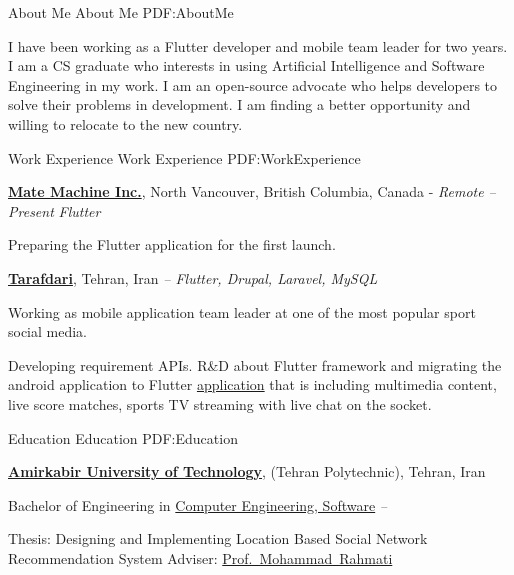 \documentclass[letterpaper,MMMyyyy,nonstopmode]{resume}
\begin{document}
\begin{Body}



\Section
{About Me}
{About Me}
{PDF:AboutMe}

I have been working as a Flutter developer and mobile team leader for two years.
I am a CS graduate who interests in using Artificial Intelligence and Software Engineering in my work.
I am an open-source advocate who helps developers to solve their problems in development.
I am finding a better opportunity and willing to relocate to the new country.


\Section
{Work\newline
Experience}
{Work Experience}
{PDF:WorkExperience}

\Entry
\href{https://matemachine.com}
{\textbf{Mate Machine Inc.}},
\small{North Vancouver, British Columbia, Canada - }\textit{\small{Remote}}
\hfill
\textsl{\small{ -- Present}}
\Gap
\small{\textit{Flutter}}

\BulletItem
Preparing the Flutter application for the first launch.

\BigGap
\Entry
\href{https://tarafdari.com}
{\textbf{Tarafdari}},
\small{Tehran, Iran}
\hfill
\textsl{\small{ -- }}
\Gap
\small{\textit{Flutter, Drupal, Laravel, MySQL}}

\BulletItem
Working as mobile application team leader at one of the most popular sport social media.
\begin{Detail}
\SubBulletItem
Developing requirement APIs.
\SubBulletItem
R\&D about Flutter framework and migrating the android application to Flutter
\href{https://play.google.com/store/apps/details?id=com.tarafdari.news}
{application}
that is including multimedia content,
live score matches, sports TV streaming with live chat on the socket.
\end{Detail}


\Section
{Education}
{Education}
{PDF:Education}

\Entry
\href{https://aut.ac.ir}
{\textbf{Amirkabir University of Technology}},
\small{(Tehran Polytechnic), Tehran, Iran}

\Gap
\BulletItem
Bachelor of Engineering in
\href{https://ce.aut.ac.ir/en}
{Computer Engineering, Software}
\hfill
\textsl{\small{ -- }}
\begin{Detail}
\SubBulletItem
Thesis:
Designing and Implementing Location Based Social Network
Recommendation System
\SubBulletItem
Adviser:
\href{https://aut.ac.ir/cv/2416/Mohammad-Rahmati?slc_lang=en&&cv=2416&mod=scv}
{Prof.~Mohammad~Rahmati}
\end{Detail}


\end{Body}
\end{document}
